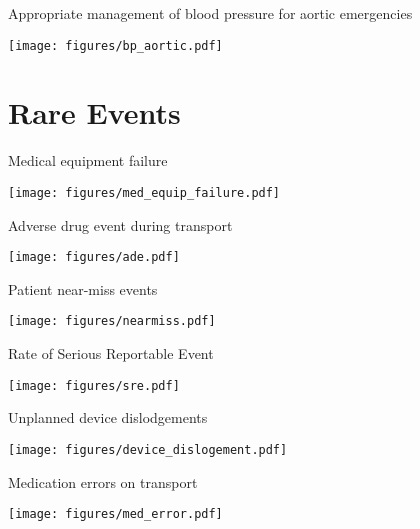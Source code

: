 \documentclass[ignorenonframetext,]{beamer}
\makeatletter
\def\maxwidth{\ifdim\Gin@nat@width>\linewidth\linewidth\else\Gin@nat@width\fi}
\def\maxheight{\ifdim\Gin@nat@height>\textheight0.8\textheight\else\Gin@nat@height\fi}
\renewcommand{\includegraphics}[2][]{%
    \Oldincludegraphics[#1,width=\maxwidth,height=\maxheight,keepaspectratio]{#2}}
\makeatother
\begin{document}
\begin{frame}{Appropriate management of blood pressure for aortic
emergencies}

\texttt{[image: figures/bp\_aortic.pdf]}

\end{frame}

\section{Rare Events}\label{rare-events}

\begin{frame}{Medical equipment failure}

\texttt{[image: figures/med\_equip\_failure.pdf]}

\end{frame}

\begin{frame}{Adverse drug event during transport}

\texttt{[image: figures/ade.pdf]}

\end{frame}

\begin{frame}{Patient near-miss events}

\texttt{[image: figures/nearmiss.pdf]}

\end{frame}

\begin{frame}{Rate of Serious Reportable Event}

\texttt{[image: figures/sre.pdf]}

\end{frame}

\begin{frame}{Unplanned device dislodgements}

\texttt{[image: figures/device\_dislogement.pdf]}

\end{frame}

\begin{frame}{Medication errors on transport}

\texttt{[image: figures/med\_error.pdf]}

\end{frame}
\end{document}
